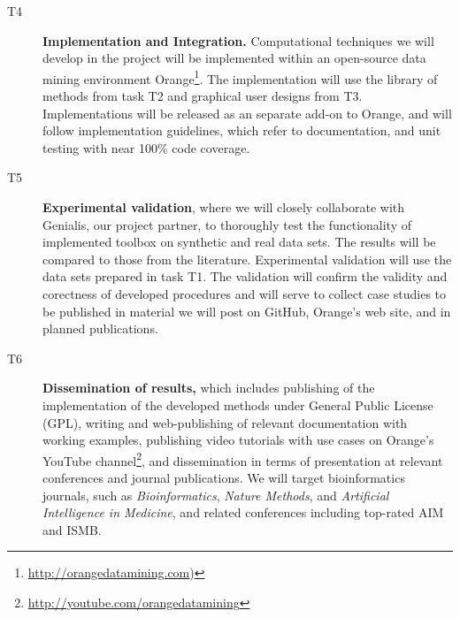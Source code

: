 \documentclass[11pt,a4paper]{article}
\renewcommand{\bold}{\textbf}
\begin{document}
\begin{description}
	\item[T4] \bold{Implementation and Integration.} Computational techniques we will develop in the project will be implemented within an open-source data mining environment Orange\footnote{\url{http://orangedatamining.com})}. The implementation will use the library of methods from task T2 and graphical user designs from T3. Implementations will be released as an separate add-on to Orange, and will follow implementation guidelines, which refer to documentation, and unit testing with near 100\% code coverage.
	\item[T5] \bold{Experimental validation}, where we will closely collaborate with Genialis, our project partner, to thoroughly test the functionality of implemented toolbox on synthetic and real data sets. The results will be compared to those from the literature. Experimental validation will use the data sets prepared in task T1. The validation will confirm the validity and corectness of developed procedures and will serve to collect case studies to be published in material we will post on GitHub, Orange's web site, and in planned publications.
	\item[T6] \bold{Dissemination of results,} which includes publishing of the implementation of the developed methods under General Public License (GPL), writing and web-publishing of relevant documentation with working examples, publishing video tutorials with use cases on Orange's YouTube channel\footnote{\url{http://youtube.com/orangedatamining}}, and dissemination in terms of presentation at relevant conferences and journal publications. We will target bioinformatics journals, such as {\em Bioinformatics}, {\em Nature Methods}, and {\em Artificial Intelligence in Medicine}, and related conferences including top-rated AIM and ISMB.
\end{description}
\end{document}
